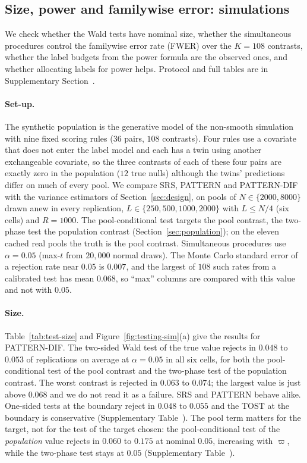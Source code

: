 \subsection{Size, power and familywise error: simulations}\label{sec:testing-sim}

We check whether the Wald tests have nominal size, whether the simultaneous procedures control the familywise error rate (FWER) over the $K=108$ contrasts, whether the label budgets from the power formula are the observed ones, and whether allocating labels for power helps. Protocol and full tables are in Supplementary Section~.

\paragraph{Set-up.} The synthetic population is the generative model of the non-smooth simulation with nine fixed scoring rules ($36$ pairs, $108$ contrasts). Four rules use a covariate that does not enter the label model and each has a twin using another exchangeable covariate, so the three contrasts of each of these four pairs are exactly zero in the population ($12$ true nulls) although the twins' predictions differ on much of every pool. We compare SRS, PATTERN and PATTERN-DIF with the variance estimators of Section~\ref{sec:design}, on pools of $N\in\{2000,8000\}$ drawn anew in every replication, $L\in\{250,500,1000,2000\}$ with $L\le N/4$ (six cells) and $R=1000$. The pool-conditional test targets the pool contrast, the two-phase test the population contrast (Section~\ref{sec:population}); on the eleven cached real pools the truth is the pool contrast. Simultaneous procedures use $\alpha=0.05$ (max-$t$ from $20{,}000$ normal draws). The Monte Carlo standard error of a rejection rate near $0.05$ is $0.007$, and the largest of $108$ such rates from a calibrated test has mean $0.068$, so ``max'' columns are compared with this value and not with $0.05$.

\paragraph{Size.} Table~\ref{tab:test-size} and Figure~\ref{fig:testing-sim}(a) give the results for PATTERN-DIF. The two-sided Wald test of the true value rejects in $0.048$ to $0.053$ of replications on average at $\alpha=0.05$ in all six cells, for both the pool-conditional test of the pool contrast and the two-phase test of the population contrast. The worst contrast is rejected in $0.063$ to $0.074$; the largest value is just above $0.068$ and we do not read it as a failure. SRS and PATTERN behave alike. One-sided tests at the boundary reject in $0.048$ to $0.055$ and the TOST at the boundary is conservative (Supplementary Table~). The pool term matters for the target, not for the test of the target chosen: the pool-conditional test of the \emph{population} value rejects in $0.060$ to $0.175$ at nominal $0.05$, increasing with $\varpi$, while the two-phase test stays at $0.05$ (Supplementary Table~).

